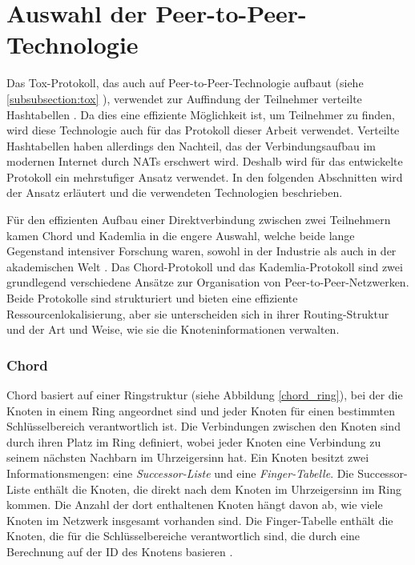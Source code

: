\section{Auswahl der Peer-to-Peer-Technologie}
\label{sec:grundlagen_des_protokolls}

Das Tox-Protokoll, das auch auf Peer-to-Peer-Technologie aufbaut (siehe \ref{subsubsection:tox} \textit{}), verwendet zur Auffindung der Teilnehmer verteilte Hashtabellen \Parencite{tox_spec}. Da dies eine effiziente Möglichkeit ist, um Teilnehmer zu finden, wird diese Technologie auch für das Protokoll dieser Arbeit verwendet. Verteilte Hashtabellen haben allerdings den Nachteil, das der Verbindungsaufbau im modernen Internet durch NATs erschwert wird. Deshalb wird für das entwickelte Protokoll ein mehrstufiger Ansatz verwendet. In den folgenden Abschnitten wird der Ansatz erläutert und die verwendeten Technologien beschrieben.

Für den effizienten Aufbau einer Direktverbindung zwischen zwei Teilnehmern kamen Chord und Kademlia in die engere Auswahl, welche beide lange Gegenstand intensiver Forschung waren, sowohl in der Industrie als auch in der akademischen Welt \parencite[S. 808]{MedranoChavez_ChordKademliaHighChurnScenarios}. 
Das Chord-Protokoll und das Kademlia-Protokoll sind zwei grundlegend verschiedene Ansätze zur Organisation von Peer-to-Peer-Netzwerken. Beide Protokolle sind strukturiert und bieten eine effiziente Ressourcenlokalisierung, aber sie unterscheiden sich in ihrer Routing-Struktur und der Art und Weise, wie sie die Knoteninformationen verwalten.

\subsubsection{Chord}
Chord basiert auf einer Ringstruktur (siehe Abbildung \ref{chord_ring}), bei der die Knoten in einem Ring angeordnet sind und jeder Knoten für einen bestimmten Schlüsselbereich verantwortlich ist. Die Verbindungen zwischen den Knoten sind durch ihren Platz im Ring definiert, wobei jeder Knoten eine Verbindung zu seinem nächsten Nachbarn im Uhrzeigersinn hat. Ein Knoten besitzt zwei Informationsmengen: eine \textit{Successor-Liste} und eine \textit{Finger-Tabelle}. Die Successor-Liste enthält die Knoten, die direkt nach dem Knoten im Uhrzeigersinn im Ring kommen. Die Anzahl der dort enthaltenen Knoten hängt davon ab, wie viele Knoten im Netzwerk insgesamt vorhanden sind. Die Finger-Tabelle enthält die Knoten, die für die Schlüsselbereiche verantwortlich sind, die durch eine Berechnung auf der ID des Knotens basieren \Parencite[S. 810-811]{MedranoChavez_ChordKademliaHighChurnScenarios}.

